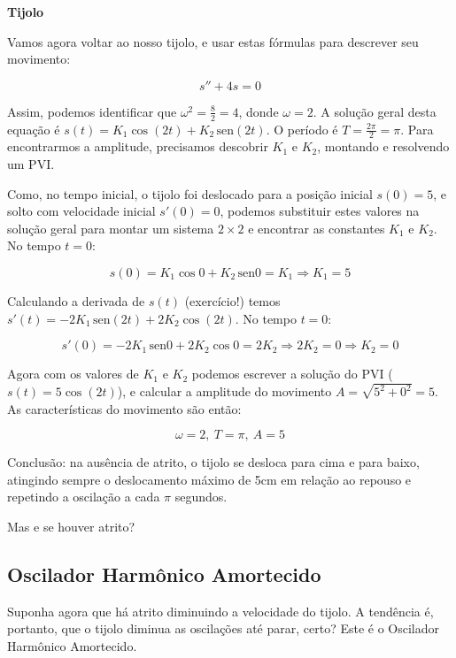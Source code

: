 \documentclass[a4paper]{article}
\providecommand{\sin}{} \renewcommand{\sin}{\hspace{2pt}\mathrm{sen}}
\begin{document}
{\bf Tijolo}

Vamos agora voltar ao nosso tijolo, e usar estas fórmulas para
descrever seu movimento:

\begin{displaymath}
  s''+4s=0
\end{displaymath}

Assim, podemos identificar que $\omega^2=\frac{8}{2}=4$, donde $\omega=2$.
A solução geral desta equação é $s(t) = K_1 \cos (2 t) + K_2 \sin (2 t)$.
O período é $T=\frac{2\pi}{2}=\pi$.
Para encontrarmos a amplitude, precisamos descobrir $K_1$ e $K_2$, montando e resolvendo um PVI.

Como, no tempo inicial, o tijolo foi deslocado para a posição inicial
$s(0)=5$, e solto com velocidade inicial $s'(0)=0$, podemos substituir
estes valores na solução geral para montar um sistema $2\times2$ e
encontrar as constantes $K_1$ e $K_2$. No tempo $t=0$:

\begin{displaymath}
  s(0) = K_1 \cos0 + K_2 \sin 0 = K_1 \Rightarrow K_1 = 5
\end{displaymath}

Calculando a derivada de $s(t)$ (exercício!) temos
$s'(t) = -2K_1 \sin (2t) + 2K_2 \cos (2t)$. No tempo $t=0$:

\begin{displaymath}
  s'(0) = -2K_1 \sin 0 + 2K_2 \cos 0 = 2K_2 \Rightarrow 2K_2 = 0
  \Rightarrow K_2=0
\end{displaymath}

Agora com os valores de $K_1$ e $K_2$ podemos escrever a solução do
PVI ($s(t) = 5\cos(2t)$), e calcular a amplitude do movimento
$A = \sqrt{5^2 +0^2} = 5$. As características do movimento são então:

\begin{displaymath}
  \omega=2,\ T=\pi,\ A = 5
\end{displaymath}

Conclusão: na ausência de atrito, o tijolo se desloca para cima e para
baixo, atingindo sempre o deslocamento máximo de 5cm em relação ao
repouso e repetindo a oscilação a cada $\pi$ segundos.

Mas e se houver atrito?

\subsection{Oscilador Harmônico Amortecido}

Suponha agora que há atrito diminuindo a velocidade do tijolo. A
tendência é, portanto, que o tijolo diminua as oscilações até parar,
certo? Este é o Oscilador Harmônico Amortecido.
\end{document}
